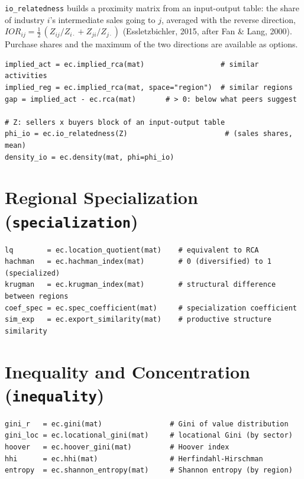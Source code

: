 \documentclass[12pt, a4paper]{article}
\newcommand{\fn}[1]{\texttt{#1}}
\begin{document}
\begin{sloppypar}
\fn{io\_relatedness} builds a proximity matrix from an input-output
table: the share of industry $i$'s intermediate sales going to $j$,
averaged with the reverse direction,
$IOR_{ij} = \tfrac12\,(Z_{ij}/Z_{i\cdot} + Z_{ji}/Z_{j\cdot})$
(Essletzbichler, 2015, after Fan \& Lang, 2000). Purchase shares and the
maximum of the two directions are available as options.
\end{sloppypar}

\begin{lstlisting}[caption={Implied RCA and input-output relatedness}]
implied_act = ec.implied_rca(mat)                  # similar activities
implied_reg = ec.implied_rca(mat, space="region")  # similar regions
gap = implied_act - ec.rca(mat)       # > 0: below what peers suggest

# Z: sellers x buyers block of an input-output table
phi_io = ec.io_relatedness(Z)                       # (sales shares, mean)
density_io = ec.density(mat, phi=phi_io)
\end{lstlisting}

\section{Regional Specialization (\texttt{specialization})}

\begin{lstlisting}[caption={Specialization indices}]
lq        = ec.location_quotient(mat)    # equivalent to RCA
hachman   = ec.hachman_index(mat)        # 0 (diversified) to 1 (specialized)
krugman   = ec.krugman_index(mat)        # structural difference between regions
coef_spec = ec.spec_coefficient(mat)     # specialization coefficient
sim_exp   = ec.export_similarity(mat)    # productive structure similarity
\end{lstlisting}

\section{Inequality and Concentration (\texttt{inequality})}

\begin{lstlisting}[caption={Inequality indicators}]
gini_r   = ec.gini(mat)                # Gini of value distribution
gini_loc = ec.locational_gini(mat)     # locational Gini (by sector)
hoover   = ec.hoover_gini(mat)         # Hoover index
hhi      = ec.hhi(mat)                 # Herfindahl-Hirschman
entropy  = ec.shannon_entropy(mat)     # Shannon entropy (by region)
\end{lstlisting}
\end{document}
